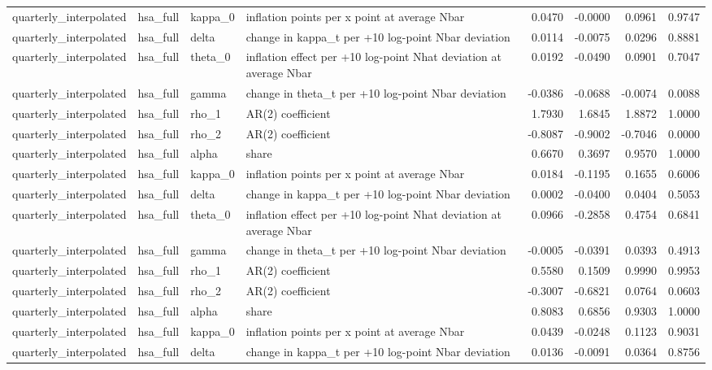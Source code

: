 \begin{tabular}{llllrrrr}
quarterly\_interpolated & hsa\_full & kappa\_0 & inflation points per x point at average Nbar & 0.0470 & -0.0000 & 0.0961 & 0.9747 \\
quarterly\_interpolated & hsa\_full & delta & change in kappa\_t per +10 log-point Nbar deviation & 0.0114 & -0.0075 & 0.0296 & 0.8881 \\
quarterly\_interpolated & hsa\_full & theta\_0 & inflation effect per +10 log-point Nhat deviation at average Nbar & 0.0192 & -0.0490 & 0.0901 & 0.7047 \\
quarterly\_interpolated & hsa\_full & gamma & change in theta\_t per +10 log-point Nbar deviation & -0.0386 & -0.0688 & -0.0074 & 0.0088 \\
quarterly\_interpolated & hsa\_full & rho\_1 & AR(2) coefficient & 1.7930 & 1.6845 & 1.8872 & 1.0000 \\
quarterly\_interpolated & hsa\_full & rho\_2 & AR(2) coefficient & -0.8087 & -0.9002 & -0.7046 & 0.0000 \\
quarterly\_interpolated & hsa\_full & alpha & share & 0.6670 & 0.3697 & 0.9570 & 1.0000 \\
quarterly\_interpolated & hsa\_full & kappa\_0 & inflation points per x point at average Nbar & 0.0184 & -0.1195 & 0.1655 & 0.6006 \\
quarterly\_interpolated & hsa\_full & delta & change in kappa\_t per +10 log-point Nbar deviation & 0.0002 & -0.0400 & 0.0404 & 0.5053 \\
quarterly\_interpolated & hsa\_full & theta\_0 & inflation effect per +10 log-point Nhat deviation at average Nbar & 0.0966 & -0.2858 & 0.4754 & 0.6841 \\
quarterly\_interpolated & hsa\_full & gamma & change in theta\_t per +10 log-point Nbar deviation & -0.0005 & -0.0391 & 0.0393 & 0.4913 \\
quarterly\_interpolated & hsa\_full & rho\_1 & AR(2) coefficient & 0.5580 & 0.1509 & 0.9990 & 0.9953 \\
quarterly\_interpolated & hsa\_full & rho\_2 & AR(2) coefficient & -0.3007 & -0.6821 & 0.0764 & 0.0603 \\
quarterly\_interpolated & hsa\_full & alpha & share & 0.8083 & 0.6856 & 0.9303 & 1.0000 \\
quarterly\_interpolated & hsa\_full & kappa\_0 & inflation points per x point at average Nbar & 0.0439 & -0.0248 & 0.1123 & 0.9031 \\
quarterly\_interpolated & hsa\_full & delta & change in kappa\_t per +10 log-point Nbar deviation & 0.0136 & -0.0091 & 0.0364 & 0.8756 \\

\end{tabular}
